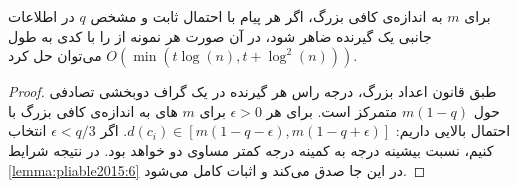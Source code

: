 \begin{theorem}
    \cite{pliable2015paper}
    \label{thm:pliable2015_8}
    برای
    $m$
    به اندازه‌ی کافی بزرگ، اگر هر پیام با احتمال ثابت و مشخص
    $q$
    در اطلاعات جانبی یک گیرنده ضاهر شود، در آن صورت هر نمونه از
    را با کدی به طول
    $O(\min(t \log(n), t + \log^2(n)))$
    می‌توان حل کرد.
\end{theorem}
\begin{proof}
    طبق قانون اعداد بزرگ، درجه راس هر گیرنده در یک گراف دوبخشی تصادفی حول
    $m (1 - q)$
    متمرکز است. برای هر
    $\epsilon > 0$
    برای
    $m$    های به اندازه‌ی کافی بزرگ با احتمال بالایی داریم:
    $d(c_i) \in [m(1 - q - \epsilon), m(1 - q + \epsilon)]$. اگر
    $\epsilon < q/3$
    انتخاب کنیم، نسبت بیشینه درجه به کمینه درجه کمتر مساوی دو خواهد بود. در نتیجه شرایط
    \autoref{lemma:pliable2015:6}
    در این جا صدق می‌کند و اثبات کامل می‌شود.
\end{proof}

